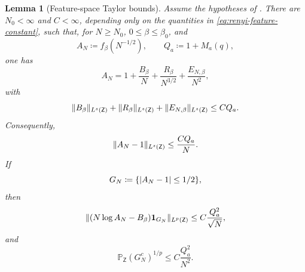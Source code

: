 \documentclass[11pt,reqno]{amsart}
\numberwithin{equation}{section}
\theoremstyle{plain}
\newtheorem{lemma}[lemma]{Lemma}
\theoremstyle{definition}
\DeclarePairedDelimiter{\abs}{\lvert}{\rvert}
\DeclarePairedDelimiter{\norm}{\lVert}{\rVert}
\newcommand{\Pb}{\mathbb P}
\newcommand{\one}{\mathbf 1}
\newcommand{\be}{\beta}
\begin{document}
\begin{lemma}[Feature-space Taylor bounds]
\label{lem:feature-taylor-bounds}
Assume the hypotheses of .  There are $N_0<\infty$ and $C<\infty$, depending only on the quantities in \eqref{eq:renyi-feature-constant}, such that, for $N\geq N_0$, $0\leq\be\leq\be_0$, and
\begin{equation}
 A_N\coloneqq f_{\be}(N^{-1/2}),
 \qquad
 Q_a\coloneqq1+M_a(q),
 \label{eq:feature-AN-Qa}
\end{equation}
one has
\begin{equation}
 A_N
 =1+\frac{B_{\be}}N+\frac{R_{\be}}{N^{3/2}}
 +\frac{E_{N,\be}}{N^2},
 \label{eq:feature-Taylor-expansion}
\end{equation}
with
\begin{equation}
 \norm{B_{\be}}_{L^s(\mathsf Z)}
 +\norm{R_{\be}}_{L^s(\mathsf Z)}
 +\norm{E_{N,\be}}_{L^s(\mathsf Z)}
 \leq C Q_a.
 \label{eq:feature-chaos-remainder-bound}
\end{equation}
Consequently,
\begin{equation}
 \norm{A_N-1}_{L^s(\mathsf Z)}
 \leq\frac{CQ_a}{N}.
 \label{eq:feature-AN-minus-one}
\end{equation}
If
\begin{equation}
 G_N\coloneqq\{\abs{A_N-1}\leq1/2\},
 \label{eq:feature-good-event}
\end{equation}
then
\begin{equation}
 \norm{(N\log A_N-B_{\be})\one_{G_N}}_{L^p(\mathsf Z)}
 \leq C\frac{Q_a^2}{\sqrt N},
 \label{eq:feature-logarithmic-error}
\end{equation}
and
\begin{equation}
 \Pb_{\mathsf Z}(G_N^c)^{1/p}
 \leq C\frac{Q_a^2}{N^2}.
 \label{eq:feature-bad-event-probability}
\end{equation}
\end{lemma}
\end{document}

